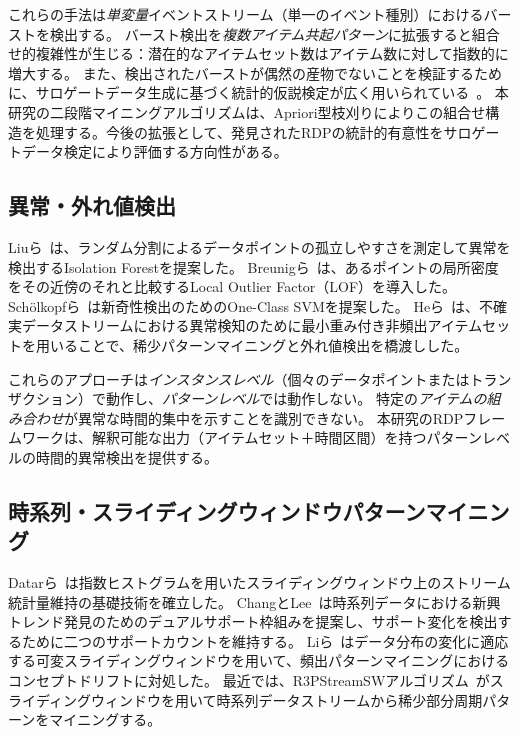 これらの手法は\emph{単変量}イベントストリーム（単一のイベント種別）におけるバーストを検出する。
バースト検出を\emph{複数アイテム共起パターン}に拡張すると組合せ的複雑性が生じる：潜在的なアイテムセット数はアイテム数に対して指数的に増大する。
また、検出されたバーストが偶然の産物でないことを検証するために、サロゲートデータ生成に基づく統計的仮説検定が広く用いられている~\cite{lancaster2018surrogate}。
本研究の二段階マイニングアルゴリズムは、Apriori型枝刈りによりこの組合せ構造を処理する。今後の拡張として、発見されたRDPの統計的有意性をサロゲートデータ検定により評価する方向性がある。

\subsection{異常・外れ値検出}

Liuら~\cite{liu2008iforest,liu2012iforest}は、ランダム分割によるデータポイントの孤立しやすさを測定して異常を検出するIsolation Forestを提案した。
Breunigら~\cite{breunig2000lof}は、あるポイントの局所密度をその近傍のそれと比較するLocal Outlier Factor（LOF）を導入した。
Sch\"olkopfら~\cite{scholkopf2001ocsvm}は新奇性検出のためのOne-Class SVMを提案した。
Heら~\cite{he2018mwifim}は、不確実データストリームにおける異常検知のために最小重み付き非頻出アイテムセットを用いることで、稀少パターンマイニングと外れ値検出を橋渡しした。

これらのアプローチは\emph{インスタンスレベル}（個々のデータポイントまたはトランザクション）で動作し、\emph{パターンレベル}では動作しない。
特定の\emph{アイテムの組み合わせ}が異常な時間的集中を示すことを識別できない。
本研究のRDPフレームワークは、解釈可能な出力（アイテムセット＋時間区間）を持つパターンレベルの時間的異常検出を提供する。

\subsection{時系列・スライディングウィンドウパターンマイニング}

Datarら~\cite{datar2002swstatistics}は指数ヒストグラムを用いたスライディングウィンドウ上のストリーム統計量維持の基礎技術を確立した。
ChangとLee~\cite{chang2009dualsupport}は時系列データにおける新興トレンド発見のためのデュアルサポート枠組みを提案し、サポート変化を検出するために二つのサポートカウントを維持する。
Liら~\cite{li2023conceptdrift}はデータ分布の変化に適応する可変スライディングウィンドウを用いて、頻出パターンマイニングにおけるコンセプトドリフトに対処した。
最近では、R3PStreamSWアルゴリズム~\cite{r3pstreamsw2025}がスライディングウィンドウを用いて時系列データストリームから稀少部分周期パターンをマイニングする。

